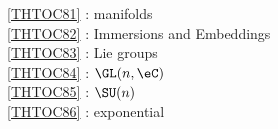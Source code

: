 \ref {THTOC81} : manifolds\\
\ref {THTOC82} : Immersions and Embeddings\\
\ref {THTOC83} : Lie groups\\
\ref {THTOC84} : \( \GL (n,\eC )\)\\
\ref {THTOC85} : \( \SU (n)\)\\
\ref {THTOC86} : exponential\\

